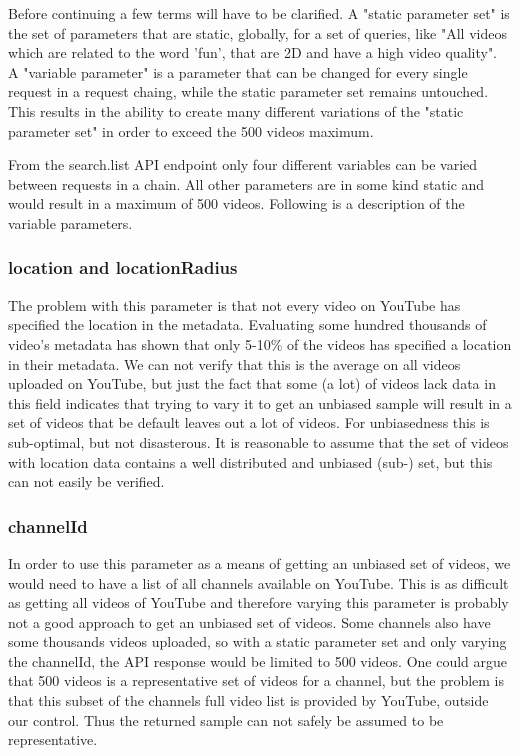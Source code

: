 Before continuing a few terms will have to be clarified. A  "static parameter 
set" is the set of parameters that are static, globally, for a set of queries, 
like "All videos which are related to the word 'fun', that are 2D and have a 
high video quality". A "variable parameter" is a parameter that can be changed 
for every single request in a request chaing, while the static parameter set 
remains untouched. This results in the ability to create many different
variations of the "static parameter set" in order to exceed the 500 videos 
maximum.

From the search.list API endpoint only four different variables can be varied 
between requests in a chain. All other parameters are in some kind static and
would result in a maximum of 500 videos. Following is a description of the
variable parameters.

\subsubsection{location and locationRadius}
The problem with this parameter is that not every video on YouTube has specified
the location in the metadata. Evaluating some hundred thousands of video's
metadata has shown that only 5-10\% of the videos has specified a location in
their metadata. We can not verify that this is the average on all videos
uploaded on YouTube, but just the fact that some (a lot) of videos lack data in
this field indicates that trying to vary it to get an unbiased sample will
result in a set of videos that be default leaves out a lot of videos. For
unbiasedness this is sub-optimal, but not disasterous. It is reasonable to
assume that the set of videos with location data contains a well distributed
and unbiased (sub-) set, but this can not easily be verified.

\subsubsection{channelId}
In order to use this parameter as a means of getting an unbiased set of videos,
we would need to have a list of all channels available on YouTube. This is as
difficult as getting all videos of YouTube and therefore varying this parameter 
is probably not a good approach to get an unbiased set of videos. Some channels
also have some thousands videos uploaded, so with a static parameter set and
only varying the channelId, the API response would be limited to 500 videos. One
could argue that 500 videos is a representative set of videos for a channel, but
the problem is that this subset of the channels full video list is provided by
YouTube, outside our control. Thus the returned sample can not safely be assumed
to be representative.

